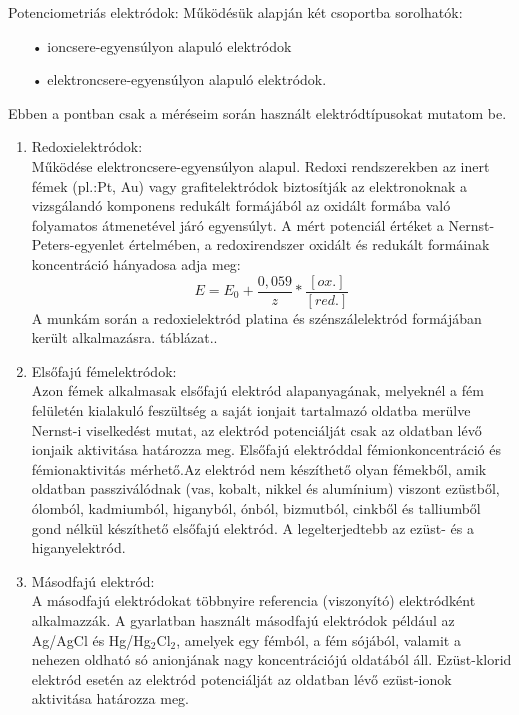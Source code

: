 Potenciometriás elektródok:
Működésük alapján két csoportba sorolhatók:
\begin{itemize}
\item[•]ioncsere-egyensúlyon alapuló elektródok
\item[•]elektroncsere-egyensúlyon alapuló elektródok.
\end{itemize} 

Ebben a pontban csak a méréseim során használt elektródtípusokat mutatom be.
\begin{enumerate}
\item Redoxielektródok:\\
Működése elektroncsere-egyensúlyon alapul. Redoxi rendszerekben az inert fémek (pl.:Pt, Au) vagy grafitelektródok biztosítják az elektronoknak a vizsgálandó komponens redukált formájából az oxidált formába való folyamatos átmenetével járó egyensúlyt. A mért potenciál értéket a Nernst-Peters-egyenlet értelmében, a redoxirendszer oxidált és redukált formáinak koncentráció hányadosa adja meg:
\begin{equation}
E= E_\text{0} + \frac{0,059}{z} * \frac{[ox.]}{[red.]}
\end{equation}
A munkám során a redoxielektród platina és szénszálelektród formájában került alkalmazásra.
táblázat..
\item Elsőfajú fémelektródok:\\
Azon fémek alkalmasak elsőfajú elektród alapanyagának, melyeknél a  fém felületén kialakuló feszültség a saját ionjait tartalmazó oldatba merülve Nernst-i viselkedést mutat, az elektród potenciálját csak az oldatban lévő ionjaik aktivitása határozza meg. Elsőfajú elektróddal fémionkoncentráció és fémionaktivitás mérhető.Az elektród nem készíthető olyan fémekből, amik oldatban passziválódnak (vas, kobalt, nikkel és alumínium) viszont ezüstből, ólomból, kadmiumból, higanyból, ónból, bizmutból, cinkből és talliumből gond nélkül készíthető elsőfajú elektród. A legelterjedtebb az ezüst- és a higanyelektród.
\item Másodfajú elektród: \cite{pfreisich1960}\\
A másodfajú elektródokat többnyire referencia (viszonyító) elektródként alkalmazzák. A gyarlatban használt másodfajú elektródok például az Ag/AgCl és Hg/Hg$_2$Cl$_2$, amelyek egy fémból, a fém sójából, valamit a nehezen oldható só anionjának nagy koncentrációjú oldatából áll. Ezüst-klorid elektród esetén az elektród potenciálját az oldatban lévő ezüst-ionok aktivitása határozza meg.\\


\end{enumerate}

